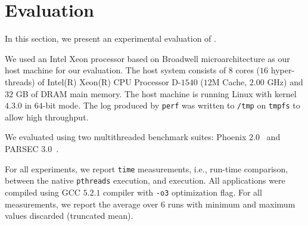 \section{Evaluation}
\label{sec:evaluation}
In this section, we present an experimental evaluation of \projecttitle.%
%





 We used an Intel Xeon processor based on Broadwell microarchitecture
as our host machine for our evaluation. The
host system consists of $8$ cores ($16$ hyper-threads) of Intel(R) Xeon(R) CPU Processor D-$1540$
($12$M Cache, $2.00$ GHz) and $32$ GB of DRAM main memory. The host
machine is running Linux with kernel $4.3.0$ in $64$-bit mode. The log produced by
{\tt perf} was written to {\tt /tmp} on {\tt tmpfs} to allow high throughput.


  We evaluated \projecttitle using two multithreaded benchmark suites: Phoenix $2.0$~\cite{phoenix} and PARSEC $3.0$~\cite{parsec}. 

%

  For all experiments,  we report {\tt time}
measurements, i.e., run-time comparison, between the native {\tt pthreads}
execution, and \projecttitle execution.  All applications were compiled using
GCC $5.2.1$ compiler with {\tt -o3} optimization flag. For all
measurements, we report the average over $6$ runs with minimum and maximum values
discarded (truncated mean).

